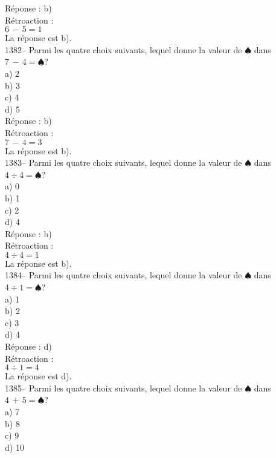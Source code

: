 ﻿\documentclass[letterpaper, 12pt]{article}
\begin{document}
R\'eponse : b)\\

R\'etroaction : \\
$6\,-\,5=1$\\
La r\'eponse est b).\\

1382-- Parmi les quatre choix suivants, lequel donne la valeur de
$\spadesuit$ dans $7\,-\,4=\spadesuit$?\\
a) 2\\
b) 3\\
c) 4\\
d) 5\\

R\'eponse : b)\\

R\'etroaction : \\
$7\,-\,4=3$\\
La r\'eponse est b).\\

1383-- Parmi les quatre choix suivants, lequel donne la valeur de
$\spadesuit$ dans $4\div4=\spadesuit$?\\
a) 0\\
b) 1\\
c) 2\\
d) 4\\

R\'eponse : b)\\

R\'etroaction : \\
$4\div4=1$\\
La r\'eponse est b).\\

1384-- Parmi les quatre choix suivants, lequel donne la valeur de
$\spadesuit$ dans $4\div1=\spadesuit$?\\
a) 1\\
b) 2\\
c) 3\\
d) 4\\

R\'eponse : d)\\

R\'etroaction : \\
$4\div1=4$\\
La r\'eponse est d).\\

1385-- Parmi les quatre choix suivants, lequel donne la valeur de
$\spadesuit$ dans $4\,+\,5=\spadesuit$?\\
a) 7\\
b) 8\\
c) 9\\
d) 10\\
\end{document}
